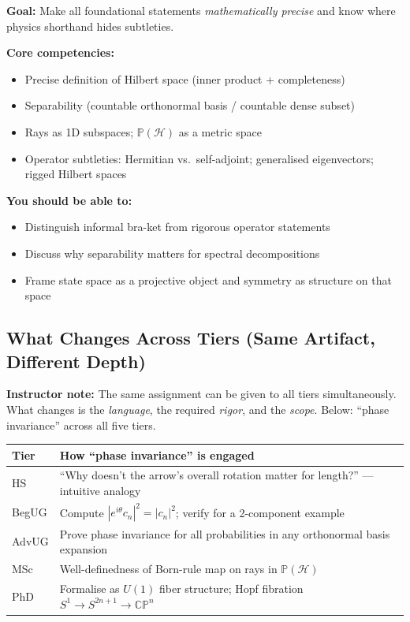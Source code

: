 \documentclass[11pt,a4paper]{article}
\newcommand{\instructornote}[1]{%
  \begin{tcolorbox}[notebox]\textbf{Instructor note:} #1\end{tcolorbox}%
}
\begin{document}
\medskip
\begin{tcolorbox}[tierbox=tier5col, title={Tier 5 --- PhD\ \ \normalfont\small[\textcolor{gradred}{Graduate track}]}]
\textbf{Goal:} Make all foundational statements \emph{mathematically precise} and know
where physics shorthand hides subtleties.

\medskip\noindent\textbf{Core competencies:}
\begin{itemize}[leftmargin=1.5em,itemsep=2pt]
  \item Precise definition of Hilbert space (inner product + completeness)
  \item Separability (countable orthonormal basis / countable dense subset)
  \item Rays as 1D subspaces; $\mathbb{P}(\mathcal{H})$ as a metric space
  \item Operator subtleties: Hermitian vs.\ self-adjoint; generalised eigenvectors;
        rigged Hilbert spaces
\end{itemize}

\medskip\noindent\textbf{You should be able to:}
\begin{itemize}[leftmargin=1.5em,itemsep=2pt]
  \item Distinguish informal bra-ket from rigorous operator statements
  \item Discuss why separability matters for spectral decompositions
  \item Frame state space as a projective object and symmetry as structure on that space
\end{itemize}
\end{tcolorbox}

\subsection{What Changes Across Tiers (Same Artifact, Different Depth)}

\instructornote{The same assignment can be given to all tiers simultaneously.
What changes is the \emph{language}, the required \emph{rigor}, and the \emph{scope}.
Below: ``phase invariance'' across all five tiers.}

\begin{center}
\begin{tabular}{lp{10.5cm}}
\toprule
\textbf{Tier} & \textbf{How ``phase invariance'' is engaged}\\
\midrule
HS     & ``Why doesn't the arrow's overall rotation matter for length?'' --- intuitive analogy\\
BegUG  & Compute $|e^{i\theta}c_n|^2=|c_n|^2$; verify for a 2-component example\\
AdvUG  & Prove phase invariance for all probabilities in any orthonormal basis expansion\\
MSc    & Well-definedness of Born-rule map on rays in $\mathbb{P}(\mathcal{H})$\\
PhD    & Formalise as $U(1)$ fiber structure; Hopf fibration
        $S^1\to S^{2n+1}\to\mathbb{CP}^n$\\
\bottomrule
\end{tabular}
\end{center}
\end{document}
